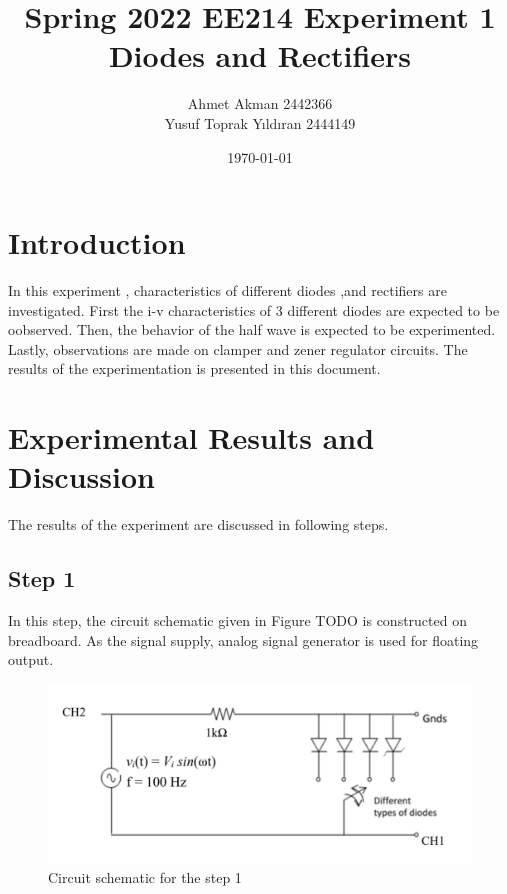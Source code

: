 \documentclass[letterpaper,12pt]{article}
\begin{document}
\title{Spring 2022 EE214 Experiment 1  \protect\\ Diodes and Rectifiers}
\author{Ahmet Akman 2442366 \protect\\ Yusuf Toprak Yıldıran 2444149}
\date{\today}
\maketitle
\tableofcontents
\section{Introduction}
In this experiment ,  characteristics of different  diodes ,and rectifiers are investigated. First the i-v characteristics of 3 different diodes are expected to be oobserved. Then, the behavior of the half wave is expected to be experimented. Lastly, observations are made on clamper and  zener regulator circuits. The results of the experimentation is presented in this document.
\section{Experimental Results and Discussion}
The results of the experiment are discussed in following steps.
\subsection{Step 1}
In this step, the circuit schematic given in Figure TODO is constructed on breadboard. As the signal supply, analog signal generator is used for floating output.
\begin{figure}[H]
\centering
\includegraphics[width=1\textwidth]{1_1.png}
\caption{Circuit schematic for the step 1}
\end{figure} 
\end{document}
